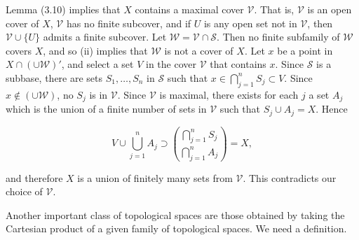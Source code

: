 Lemma (3.10) implies that $X$ contains a maximal cover $\mathcal{V}$. That is, $\mathcal{V}$ is an open cover of $X$, $\mathcal{V}$ has no finite subcover, and if $U$ is any open set not in $\mathcal{V}$, then $\mathcal{V} \cup \{U\}$ admits a finite subcover. Let $\mathcal{W} = \mathcal{V} \cap \mathcal{S}$. Then no finite subfamily of $\mathcal{W}$ covers $X$, and so (ii) implies that $\mathcal{W}$ is not a cover of $X$. Let $x$ be a point in $X \cap (\cup \mathcal{W})'$, and select a set $V$ in the cover $\mathcal{V}$ that contains $x$. Since $\mathcal{S}$ is a subbase, there are sets $S_1, \ldots, S_n$ in $\mathcal{S}$ such that $x \in \bigcap_{j=1}^{n} S_j \subset V$. Since $x \notin (\cup \mathcal{W})$, no $S_j$ is in $\mathcal{V}$. Since $\mathcal{V}$ is maximal, there exists for each $j$ a set $A_j$ which is the union of a finite number of sets in $\mathcal{V}$ such that $S_j \cup A_j = X$. Hence

$$V \cup \bigcup_{j=1}^{n} A_j \supset \binom{\bigcap_{j=1}^{n} S_j}{\bigcap_{j=1}^{n} A_j} = X,$$

and therefore $X$ is a union of finitely many sets from $\mathcal{V}$. This contradicts our choice of $\mathcal{V}$.

Another important class of topological spaces are those obtained by taking the Cartesian product of a given family of topological spaces. We need a definition.